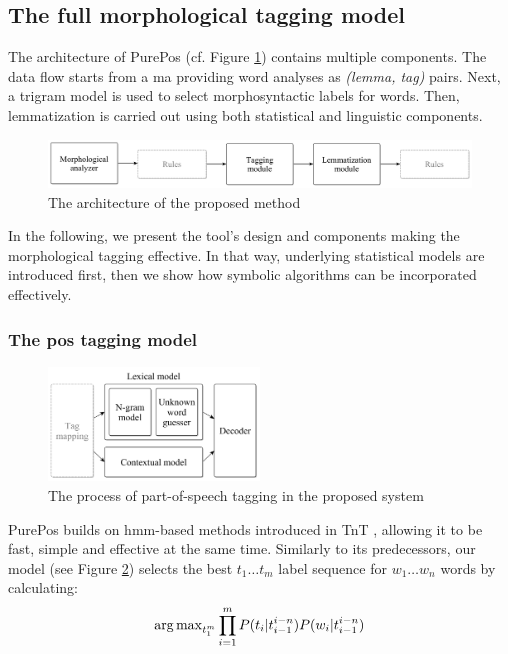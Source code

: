 \subsection{The full morphological tagging model}
\label{sec:purepos}

The architecture of PurePos (cf. Figure \ref{fig:purepos-arch}) contains multiple components. 
The data flow starts from a \gls{ma} providing word analyses as \emph{(lemma, tag)} pairs. 
Next, a trigram model is used to select morphosyntactic labels for words. 
Then, lemmatization is carried out using both statistical and linguistic components. 

\begin{figure}[H]
  \centering
  \includegraphics[width=1\textwidth]{MorphTagging/architecture.png} 
  \caption{The architecture of the proposed method}
  \label{fig:purepos-arch}
\end{figure}

In the following, we present the tool's design and components making the morphological tagging effective. 
In that way,  underlying statistical models are introduced first, then we show how symbolic algorithms can be incorporated effectively. 

\subsubsection{The \gls{pos} tagging model}

\begin{figure}[H]
  \centering
  \includegraphics[width=0.5\textwidth]{MorphTagging/pos_arch.png} 
  \caption{The process of part-of-speech tagging in the proposed system}
  \label{fig:pos_arch}
\end{figure}

PurePos builds on \acrshort{hmm}-based methods \cite{Rabiner1989,Samuelsson1993} introduced in TnT \cite{Brants2000}, allowing it to be fast, simple and effective at the same time. 
Similarly to its predecessors, our model (see Figure \ref{fig:pos_arch}) selects the best $t_1 \dots t_m$ label sequence for $w_1 \dots w_n$ words by calculating:
\begin{equation}
\operatorname{arg\,max}_{t_1^m} \prod_{i=1}^m P(t_i | t_{i-1}^{i-n}) P(w_i|t_{i-1}^{i-n})
\end{equation}

